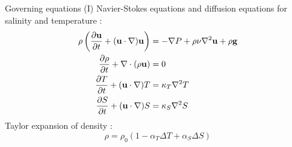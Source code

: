 \documentclass[10pt]{beamer}
\begin{document}
\begin{frame}{Governing equations (I)}
Navier-Stokes equations and diffusion equations for salinity and temperature :
\begin{equation}
  \begin{aligned}
    \rho\left(\frac{\partial\mathbf{u}}{\partial t} + (\mathbf{u}\cdot\nabla)\mathbf{u}\right) & = -\nabla P + \rho\nu\nabla^2\mathbf{u} + \rho \mathbf{g} \\
    \pdv{\rho}{t} + \nabla\cdot(\rho\mathbf{u})                                                & = 0                                                       \\
    \frac{\partial T}{\partial t} + (\mathbf{u}\cdot\nabla)T                                   & = \kappa_T \nabla^2T                                      \\
    \frac{\partial S}{\partial t} + (\mathbf{u}\cdot\nabla)S                                   & = \kappa_S \nabla^2S                                      \\
  \end{aligned}
\end{equation}
Taylor expansion of density :
\begin{equation}
  \rho = \rho_0(1-\alpha_T\Delta T + \alpha_S\Delta S)
\end{equation}


\end{frame}
\end{document}
